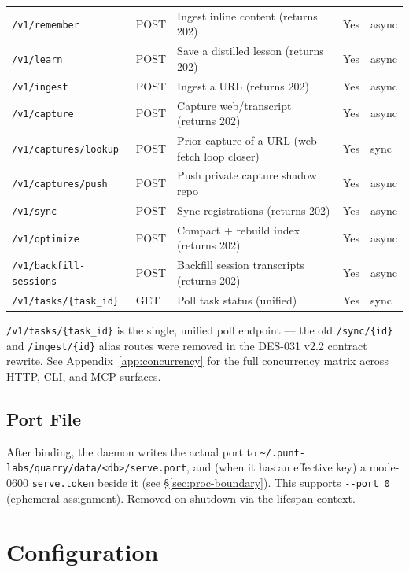 \documentclass[a4paper,10pt]{article}
\begin{document}
\begin{center}
\begin{tabular}{llp{5.3cm}ll}
\texttt{/v1/remember}         & POST   & Ingest inline content (returns 202) & Yes & async \\
\texttt{/v1/learn}            & POST   & Save a distilled lesson (returns 202) & Yes & async \\
\texttt{/v1/ingest}           & POST   & Ingest a URL (returns 202)       & Yes & async \\
\texttt{/v1/capture}          & POST   & Capture web/transcript (returns 202) & Yes & async \\
\texttt{/v1/captures/lookup}  & POST   & Prior capture of a URL (web-fetch loop closer) & Yes & sync  \\
\texttt{/v1/captures/push}    & POST   & Push private capture shadow repo & Yes & async \\
\texttt{/v1/sync}             & POST   & Sync registrations (returns 202) & Yes & async \\
\texttt{/v1/optimize}         & POST   & Compact + rebuild index (returns 202) & Yes & async \\
\texttt{/v1/backfill-sessions}& POST   & Backfill session transcripts (returns 202) & Yes & async \\
\texttt{/v1/tasks/\{task\_id\}} & GET  & Poll task status (unified)       & Yes & sync  \\
\bottomrule
\end{tabular}
\end{center}

\texttt{/v1/tasks/\{task\_id\}} is the single, unified poll endpoint ---
the old \texttt{/sync/\{id\}} and \texttt{/ingest/\{id\}} alias routes
were removed in the DES-031 v2.2 contract rewrite.  See
Appendix~\ref{app:concurrency} for the full concurrency matrix across
HTTP, CLI, and MCP surfaces.

\subsection{Port File}

After binding, the daemon writes the actual port to
\texttt{\~{}/.punt-labs/quarry/data/<db>/serve.port}, and (when it has an
effective key) a mode-0600 \texttt{serve.token} beside it (see
\S\ref{sec:proc-boundary}).  This supports \texttt{-{}-port 0} (ephemeral
assignment).  Removed on shutdown via the lifespan context.

\section{Configuration}
\end{document}
